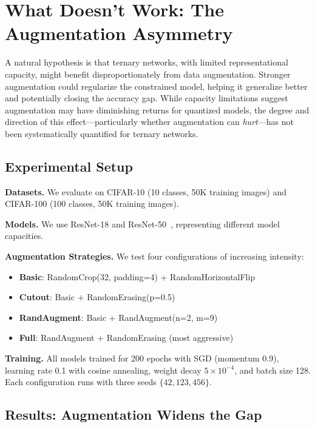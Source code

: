 \documentclass[10pt]{article}
\begin{document}
\section{What Doesn't Work: The Augmentation Asymmetry}
\label{sec:augmentation}

A natural hypothesis is that ternary networks, with limited representational capacity, might benefit disproportionately from data augmentation. Stronger augmentation could regularize the constrained model, helping it generalize better and potentially closing the accuracy gap. While capacity limitations suggest augmentation may have diminishing returns for quantized models, the degree and direction of this effect---particularly whether augmentation can \emph{hurt}---has not been systematically quantified for ternary networks.

\subsection{Experimental Setup}

\textbf{Datasets.} We evaluate on CIFAR-10 (10 classes, 50K training images) and CIFAR-100 (100 classes, 50K training images).

\textbf{Models.} We use ResNet-18 and ResNet-50~\cite{he2016resnet}, representing different model capacities.

\textbf{Augmentation Strategies.} We test four configurations of increasing intensity:
\begin{itemize}
    \item \textbf{Basic}: RandomCrop(32, padding=4) + RandomHorizontalFlip
    \item \textbf{Cutout}: Basic + RandomErasing(p=0.5)~\cite{devries2017cutout}
    \item \textbf{RandAugment}: Basic + RandAugment(n=2, m=9)~\cite{cubuk2020randaugment}
    \item \textbf{Full}: RandAugment + RandomErasing (most aggressive)
\end{itemize}

\textbf{Training.} All models trained for 200 epochs with SGD (momentum 0.9), learning rate 0.1 with cosine annealing, weight decay $5 \times 10^{-4}$, and batch size 128. Each configuration runs with three seeds $\{42, 123, 456\}$.

\subsection{Results: Augmentation Widens the Gap}
\end{document}
